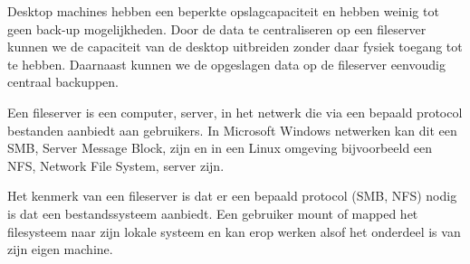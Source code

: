 Desktop machines hebben een beperkte opslagcapaciteit en hebben weinig tot geen back-up mogelijkheden. Door de data te centraliseren op een fileserver kunnen we de capaciteit van de desktop uitbreiden zonder daar fysiek toegang tot te hebben. Daarnaast kunnen we de opgeslagen data op de fileserver eenvoudig centraal backuppen.

Een fileserver is een computer, server, in het netwerk die via een bepaald protocol bestanden aanbiedt aan gebruikers. In Microsoft Windows netwerken kan dit een SMB, Server Message Block, zijn en in een Linux omgeving bijvoorbeeld een NFS, Network File System, server zijn.

Het kenmerk van een fileserver is dat er een bepaald protocol (SMB, NFS) nodig is dat een bestandssysteem aanbiedt. Een gebruiker mount of mapped het filesysteem naar zijn lokale systeem en kan erop werken alsof het onderdeel is van zijn eigen machine.
